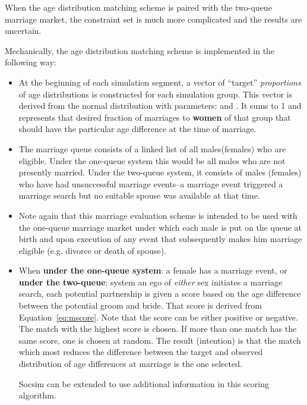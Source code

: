 When the age distribution matching scheme is paired with the two-queue
marriage market, the constraint set is much more complicated and the
results are uncertain.



Mechanically, the age distribution matching scheme is implemented in
the following way:

\begin{itemize}
\item At the beginning of each simulation segment, a vector of
  ``target'' \emph{proportions} of age distributions is constructed
  for each simulation group. This vector is derived from the normal
  distribution with parameters:  and
  . It  sums to 1 and represents that desired
  fraction of marriages to \textbf{women} of that group that should
  have the particular age difference at the time of marriage.

\item The marriage queue consists of a linked list of all males(females) who
  are eligible. Under the one-queue system this would be all males who
  are not presently married. Under the two-queue system, it
  consists of males (females) who have had unsuccessful marriage events--a
  marriage event triggered a marriage search but no suitable spouse
  was available at that time.  

\item Note again that this marriage evaluation scheme is intended to
  be used with the one-queue marriage market under which each male is
  put on the queue at birth and upon execution of any event that
  subsequently makes him marriage eligible (e.g. divorce or death of
  spouse).

\item When \textbf{under the one-queue system}: a female has a
  marriage event, or \textbf{under the two-queue}: system an ego of
  \emph{either} sex initiates a marriage search, each potential
  partnership is given a score based on the age difference between the
  potential groom and bride.  That score is derived from
  Equation~\ref{eq:mscore}.  Note that the score can be either
  positive or negative. The match with the highest score is chosen. If
  more than one match has the same score, one is chosen at random.
  The result (intention) is that the match which most reduces the
  difference between the target and observed distribution of age
  differences at marriage is the one selected.

  Socsim can be extended to use additional information in this scoring
  algorithm.



\end{itemize}
